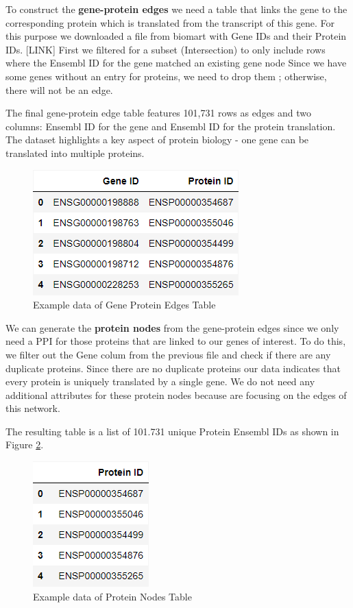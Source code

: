 To construct the \textbf{gene-protein edges} we need a table that links the gene to the corresponding protein
which is translated from the transcript of this gene.
For this purpose we downloaded a file from biomart with Gene IDs and their Protein IDs. [LINK]
First we filtered for a subset (Intersection) to only include rows where the Ensembl ID for the gene matched an existing gene node
Since we have some genes without an entry for proteins, we need to drop them ; otherwise, there will not be an edge.

The final gene-protein edge table features 101,731 rows as edges and two columns:
Ensembl ID for the gene and Ensembl ID for the protein translation.
The dataset highlights a key aspect of protein biology - one gene can be translated into multiple proteins.

\begin{figure}[h]
\centering
\includegraphics[height=\dfheight]{figures/03_02_gene_protein_edges}
\caption{Example data of Gene Protein Edges Table}
\label{fig:03_02_df_gene_protein_edges}
\end{figure}


We can generate the \textbf{protein nodes} from the gene-protein edges
since we only need a PPI for those proteins that are linked to our genes of interest.
To do this, we filter out the Gene colum from the previous file and check if there are any duplicate proteins.
Since there are no duplicate proteins our data indicates that every protein is uniquely translated by a single gene.
We do not need any additional attributes for these protein nodes because are focusing on the edges of this network.

The resulting table is a list of 101.731 unique Protein Ensembl IDs as shown in Figure \ref{fig:03_02_df_protein_nodes}.
\begin{figure}[h]
\centering
\includegraphics[height=\dfheight]{figures/03_02_protein_nodes}
\caption{Example data of Protein Nodes Table}
\label{fig:03_02_df_protein_nodes}
\end{figure}
\\


